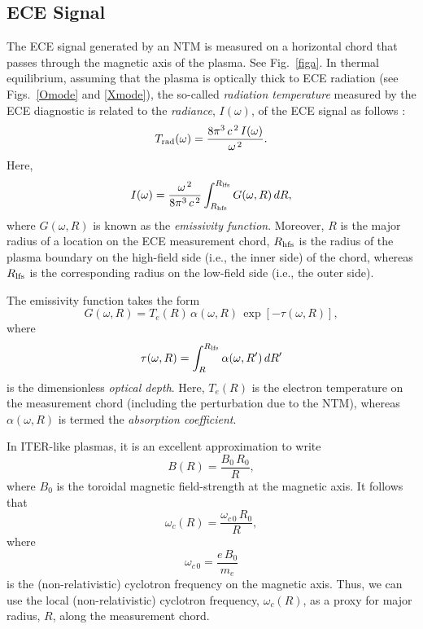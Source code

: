 \documentclass{iopjournal}
\begin{document}
{\subsection{ECE Signal}
The ECE signal generated by an NTM is  measured on a horizontal chord that passes through the magnetic axis of the plasma. See Fig.~\ref{figa}. 
In thermal equilibrium, assuming that the plasma is optically thick to ECE radiation (see Figs.~\ref{Omode} and \ref{Xmode}), the so-called {\em radiation temperature}\/ measured by the ECE diagnostic is related to the {\em radiance}, $I(\omega)$, of the ECE signal as follows \cite{bornatici}:
\begin{equation}\label{a8}
T_{\rm rad}(\omega)=\frac{8\pi^3\,c^{\,2}\, I(\omega)}{\omega^{\,2}}.
\end{equation}
Here,
\begin{equation}\label{a9}
I(\omega) = \frac{\omega^{\,2}}{8\pi^3\,c^{\,2}}\int_{R_{\rm hfs}}^{R_{\rm lfs}}G(\omega, R)\,dR,
\end{equation}
where $G(\omega,R)$ is known as the {\em emissivity function}. Moreover, $R$ is the major radius of a location on the ECE measurement chord, $R_{\rm hfs}$ is the radius
of the plasma boundary on the high-field side (i.e., the inner side) of the chord, whereas $R_{\rm lfs}$ is the corresponding radius 
on the low-field side (i.e., the outer side).

The emissivity function takes the form \cite{bornatici}
\begin{equation}\label{a10}
G(\omega, R) = T_e(R)\,\alpha(\omega,R)\,\exp\left[-\tau(\omega,R)\right],
\end{equation}
where 
\begin{equation}\label{a11}
\tau(\omega,R) = \int_R^{R_{\rm lfs}}\alpha(\omega,R')\,dR'
\end{equation}
is the dimensionless {\em optical depth}. 
Here, $T_e(R)$ is the electron temperature on the measurement chord (including the perturbation due to the NTM), whereas $\alpha(\omega,R)$
is termed the {\em absorption coefficient}.

In ITER-like plasmas, it is an excellent approximation to write
\begin{equation}
B(R) = \frac{B_0\,R_0}{R},
\end{equation}
where $B_0$ is the toroidal magnetic field-strength at the magnetic axis.  It follows that
\begin{equation}\label{a13}
\omega_c(R) = \frac{\omega_{c\,0}\,R_0}{R},
\end{equation}
where
\begin{equation}
\omega_{c\,0} = \frac{e\,B_0}{m_e}
\end{equation}
is the (non-relativistic) cyclotron frequency on the magnetic axis. Thus, we can use the local (non-relativistic) cyclotron frequency, $\omega_c(R)$, as a proxy for major radius, $R$,  along the measurement chord. 

}
\end{document}
